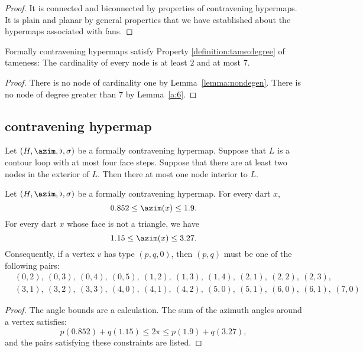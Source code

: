 \begin{proof}
It is connected and biconnected by properties of contravening hypermaps.
It is plain and planar by general properties that we have established
about the hypermaps associated with fans.
\end{proof}


\begin{lemma} 
Formally contravening hypermaps satisfy Property
\ref{definition:tame:degree} of tameness: The cardinality of every
node is at least $2$ and at most $7$.
\end{lemma}

\begin{proof}  There is no node of cardinality one by
Lemma~\ref{lemma:nondegen}.  There is no node of degree
greater than $7$ by Lemma~\ref{a:6}.
\end{proof}


\subsection{contravening hypermap}





\begin{lemma}\label{lemma:no-2}
Let $(H,\azim,\flat,\sigma)$ be a formally contravening hypermap.
Suppose that $L$ is a contour loop with at most four face steps.
Suppose that there are at least two nodes in the exterior of $L$.
Then there at most one node interior to $L$.
\end{lemma}


\begin{lemma} \label{lemma:0.852}
Let $(H,\azim,\flat,\sigma)$ be a formally contravening
hypermap. For every dart $x$,
    $$0.852\le \azim(x)\le 1.9.$$
For every dart $x$ whose face is not a triangle, we have
    $$1.15\le\azim(x)\le 3.27.$$
Consequently, if a vertex $v$ has type $(p,q,0)$, then $(p,q)$
must be one of the following pairs:
$$
\begin{array}{lll}
&(0,2),~(0,3),~(0,4),~(0,5),~(1,2),~(1,3),~(1,4),~(2,1),~(2,2),~(2,3),\\
&(3,1),~(3,2),~(3,3),~(4,0),~(4,1),~(4,2),~(5,0),~(5,1),~(6,0),~(6,1),~(7,0)
\end{array}
$$
\end{lemma}
\begin{proof}
The angle bounds are a calculation.  The sum of the azimuth angles
around a vertex satisfies:
$$
  p (0.852) + q (1.15) \le 2\pi \le p (1.9) + q (3.27),
$$
and the pairs satisfying these constraints are listed.
\end{proof}



